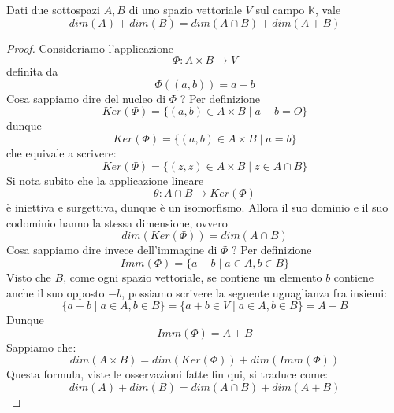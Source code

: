 \begin{theorem}[Grassmann]
	Dati due sottospazi $A, B$ di uno spazio vettoriale $V$ sul campo
	$\mathbb{K}$, vale
	\begin{equation*}
		dim(A) + dim(B) = dim(A \cap B) + dim(A + B)
	\end{equation*}
	\begin{proof}
		Consideriamo l'applicazione
		\begin{equation*}
			\Phi : A \times B \to V
		\end{equation*}
		definita da
		\[ \Phi((a, b)) = a - b \]
		Cosa sappiamo dire del nucleo di $\Phi$ ? Per definizione
		\begin{equation*}
			Ker(\Phi) = \{(a, b) \in A \times B \mid a - b = O\}
		\end{equation*}
		dunque
		\begin{equation*}
			Ker(\Phi) = \{(a, b) \in A \times B \mid a = b\}
		\end{equation*}
		che equivale a scrivere:
		\begin{equation*}
			Ker(\Phi) = \{(z, z) \in A \times B \mid z \in A \cap B\}
		\end{equation*}
		Si nota subito che la applicazione lineare
		\[ \theta : A \cap B \to Ker(\Phi) \]
		\`e iniettiva e surgettiva, dunque \`e un isomorfismo. Allora il suo dominio e
		il suo codominio hanno la stessa dimensione, ovvero
		\begin{equation*}
			dim(Ker(\Phi)) = dim(A \cap B)
		\end{equation*}
		Cosa sappiamo dire invece dell'immagine di $\Phi$ ? Per definizione
		\begin{equation*}
			Imm(\Phi) = \{a - b \mid a \in A, b \in B\}
		\end{equation*}
		Visto che $B$, come ogni spazio vettoriale, se contiene un elemento
		$b$ contiene anche il suo opposto $-b$, possiamo scrivere la seguente
		uguaglianza fra insiemi:
		\begin{equation*}
			\{ a - b \mid a \in A, b \in B \} =
			\{ a + b \in V \mid a \in A, b \in B \} =
			A + B
		\end{equation*}
		Dunque
		\begin{equation*}
			Imm(\Phi) = A + B
		\end{equation*}
		Sappiamo che:
		\begin{equation*}
			dim(A \times B) = dim(Ker(\Phi)) + dim(Imm(\Phi))
		\end{equation*}
		Questa formula, viste le osservazioni fatte fin qui, si traduce come:
		\begin{equation*}
			dim(A) + dim(B) = dim(A \cap B) + dim(A + B)
		\end{equation*}
	\end{proof}
\end{theorem}